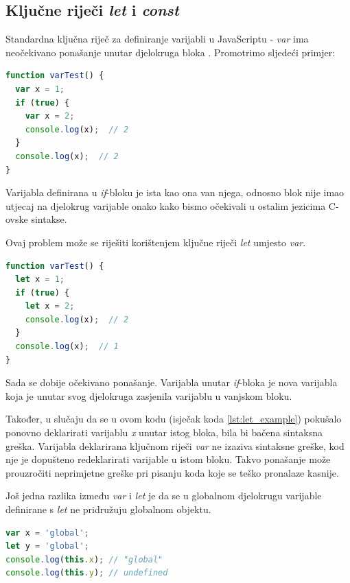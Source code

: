 \documentclass[times, utf8, zavrsni, numeric]{fer}
\newcommand{\razmakp}{\vspace{18pt}}
\newcommand{\razmaks}{\vspace{10pt}}
\begin{document}
\subsection{Ključne riječi \emph{let} i \emph{const}}

Standardna ključna riječ za definiranje varijabli u JavaScriptu - \emph{var} ima neočekivano ponašanje unutar djelokruga bloka . Promotrimo sljedeći primjer:

\razmakp
\begin{lstlisting}[language=JavaScript, caption={Primjer djelokruga \emph{var} varijable}]
function varTest() {
  var x = 1;
  if (true) {
    var x = 2;
    console.log(x);  // 2
  }
  console.log(x);  // 2
}
\end{lstlisting}
\razmaks

Varijabla definirana u \emph{if}-bloku je ista kao ona van njega, odnosno blok nije imao utjecaj na djelokrug varijable onako kako bismo očekivali u ostalim jezicima C-ovske sintakse.
\razmakp

Ovaj problem može se riješiti korištenjem ključne riječi \emph{let} umjesto \emph{var}\citep{MDNLet}.

\razmakp
\begin{lstlisting}[language=JavaScript, caption={Primjer djelokruga \emph{let} varijable}, label={lst:let_example}]
function varTest() {
  let x = 1;
  if (true) {
    let x = 2;
    console.log(x);  // 2
  }
  console.log(x);  // 1
}
\end{lstlisting}
\razmaks

Sada se dobije očekivano ponašanje. Varijabla unutar \emph{if}-bloka je nova varijabla koja je unutar svog djelokruga zasjenila varijablu u vanjskom bloku.

Također, u slučaju da se u ovom kodu (isječak koda \ref{lst:let_example}) pokušalo ponovno deklarirati varijablu \emph{x} unutar istog bloka, bila bi bačena sintaksna greška.
Varijabla deklarirana ključnom riječi \emph{var} ne izaziva sintaksne greške, kod nje je dopušteno redeklarirati varijable u istom bloku.
Takvo ponašanje može prouzročiti neprimjetne greške pri pisanju koda koje se teško pronalaze kasnije.

\razmakp

Još jedna razlika između \emph{var} i \emph{let} je da se u globalnom djelokrugu varijable definirane s \emph{let} ne pridružuju globalnom objektu.

\razmakp
\begin{lstlisting}[language=JavaScript, caption={Odnos \emph{var} i \emph{let} s globalnim objektom}]
var x = 'global';
let y = 'global';
console.log(this.x); // "global"
console.log(this.y); // undefined
\end{lstlisting}
\razmaks
\end{document}
